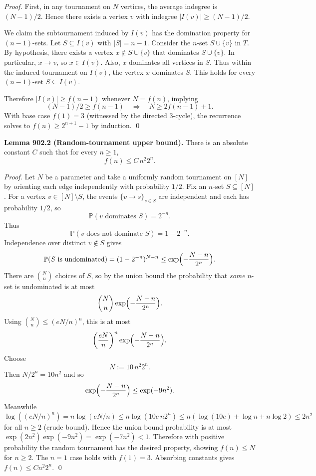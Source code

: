 \emph{Proof.}
First, in any tournament on $N$ vertices, the average indegree is $(N-1)/2$.
Hence there exists a vertex $v$ with indegree
$|I(v)|\ge (N-1)/2$.

We claim the subtournament induced by $I(v)$ has the domination property for
$(n-1)$-sets. Let $S\subseteq I(v)$ with $|S|=n-1$.
Consider the $n$-set $S\cup\{v\}$ in $T$.
By hypothesis, there exists a vertex $x\notin S\cup\{v\}$ that dominates
$S\cup\{v\}$.
In particular, $x\to v$, so $x\in I(v)$.
Also, $x$ dominates all vertices in $S$.
Thus within the induced tournament on $I(v)$, the vertex $x$ dominates $S$.
This holds for every $(n-1)$-set $S\subseteq I(v)$.

Therefore $|I(v)|\ge f(n-1)$ whenever $N=f(n)$, implying
\[(N-1)/2 \ge f(n-1)\quad\Rightarrow\quad N\ge 2f(n-1)+1.
\]
With base case $f(1)=3$ (witnessed by the directed 3-cycle), the recurrence solves
to $f(n)\ge 2^{n+1}-1$ by induction.
\qed

\medskip
\noindent\textbf{Lemma 902.2 (Random-tournament upper bound).}
There is an absolute constant $C$ such that for every $n\ge 1$,
\[ f(n)\le C\, n^2 2^n. \]

\emph{Proof.}
Let $N$ be a parameter and take a uniformly random tournament on $[N]$ by
orienting each edge independently with probability $1/2$.
Fix an $n$-set $S\subseteq[N]$.
For a vertex $v\in[N]\setminus S$, the events $\{v\to s\}_{s\in S}$ are independent
and each has probability $1/2$, so
\[\mathbb{P}(v\text{ dominates }S)=2^{-n}.
\]
Thus
\[\mathbb{P}(v\text{ does not dominate }S)=1-2^{-n}.
\]
Independence over distinct $v\notin S$ gives
\[
\mathbb{P}(S\text{ is undominated}) = (1-2^{-n})^{N-n}
\le \exp\Bigl(-\frac{N-n}{2^n}\Bigr).
\]
There are $\binom{N}{n}$ choices of $S$, so by the union bound the probability
that \emph{some} $n$-set is undominated is at most
\[
\binom{N}{n}\exp\Bigl(-\frac{N-n}{2^n}\Bigr).
\]
Using $\binom{N}{n}\le (eN/n)^n$, this is at most
\[
\left(\frac{eN}{n}\right)^n \exp\Bigl(-\frac{N-n}{2^n}\Bigr).
\]
Choose
\[ N := 10\,n^2 2^n. \]
Then $N/2^n=10n^2$ and so
\[
\exp\Bigl(-\frac{N-n}{2^n}\Bigr) \le \exp(-9n^2).
\]
Meanwhile
\[
\log\left( (eN/n)^n\right) = n\log(eN/n) \le n\log(10e\,n2^n)
\le n(\log(10e)+\log n + n\log 2)\le 2n^2
\]
for all $n\ge 2$ (crude bound).
Hence the union bound probability is at most $\exp(2n^2)\exp(-9n^2)=\exp(-7n^2)<1$.
Therefore with positive probability the random tournament has the desired
property, showing $f(n)\le N$ for $n\ge 2$.
The $n=1$ case holds with $f(1)=3$.
Absorbing constants gives $f(n)\le Cn^2 2^n$.
\qed

